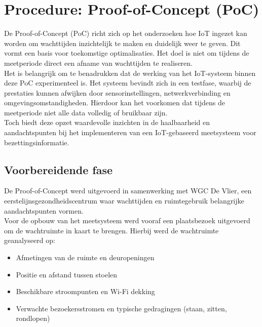 

\section{Procedure: Proof-of-Concept (PoC)} \TODO %
De Proof-of-Concept (PoC) richt zich op het onderzoeken hoe IoT ingezet kan worden om wachttijden inzichtelijk te maken en duidelijk weer te geven. Dit vormt een basis voor toekomstige optimalisaties. Het doel is niet om tijdens de meetperiode direct een afname van wachttijden te realiseren. \\

Het is belangrijk om te benadrukken dat de werking van het IoT-systeem binnen deze PoC experimenteel is. Het systeem bevindt zich in een testfase, waarbij de prestaties kunnen afwijken door sensorinstellingen, netwerkverbinding en omgevingsomstandigheden. Hierdoor kan het voorkomen dat tijdens de meetperiode niet alle data volledig of bruikbaar zijn. \\

Toch biedt deze opzet waardevolle inzichten in de haalbaarheid en aandachtspunten bij het implementeren van een IoT-gebaseerd meetsysteem voor bezettingsinformatie.

\subsection{Voorbereidende fase}

De Proof-of-Concept werd uitgevoerd in samenwerking met WGC De Vlier, een eerstelijnsgezondheidscentrum waar wachttijden en ruimtegebruik belangrijke aandachtspunten vormen. \\

Voor de opbouw van het meetsysteem werd vooraf een plaatsbezoek uitgevoerd om de wachtruimte in kaart te brengen. Hierbij werd de wachtruimte geanalyseerd op:

\begin{itemize}
    \item Afmetingen van de ruimte en deuropeningen
    \item Positie en afstand tussen stoelen
    \item Beschikbare stroompunten en Wi-Fi dekking
    \item Verwachte bezoekersstromen en typische gedragingen (staan, zitten, rondlopen)
\end{itemize}

